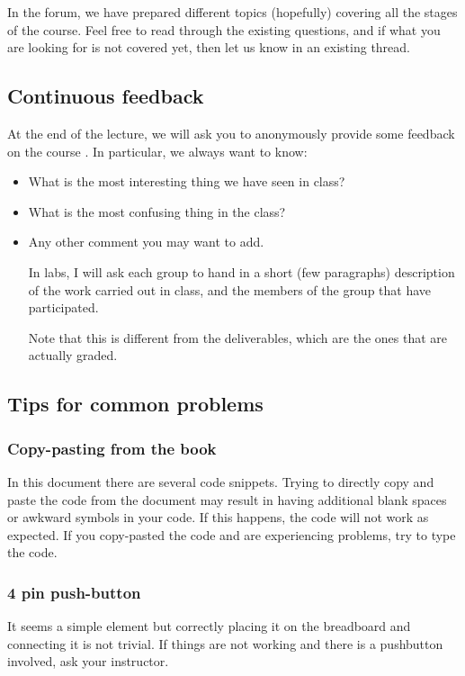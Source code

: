In the forum, we have prepared different topics (hopefully) covering all the stages of the course. Feel free to read through the existing questions, and if what you are looking for is not covered yet, then let us know in an existing thread.

\subsection{Continuous feedback}
At the end of the lecture, we will ask you to anonymously provide some feedback on the course \emph{}.
In particular, we always want to know:
\begin{itemize}
\item What is the most interesting thing we have seen in class?
\item What is the most confusing thing in the class?
\item Any other comment you may want to add.

In labs, I will ask each group to hand in a short (few paragraphs) description of the work carried out in class, and the members of the group that have participated.

Note that this is different from the deliverables, which are the ones that are actually graded.
\end{itemize}

\subsection{Tips for common problems}

\subsubsection{Copy-pasting from the book}
In this document there are several code snippets. 
Trying to directly copy and paste the code from the document may result in having additional blank spaces or awkward symbols in your code.
If this happens, the code will not work as expected.
If you copy-pasted the code and are experiencing problems, try to type the code.

\subsubsection{4 pin push-button}
It seems a simple element but correctly placing it on the breadboard and connecting it is not trivial.
If things are not working and there is a pushbutton involved, ask your instructor.

